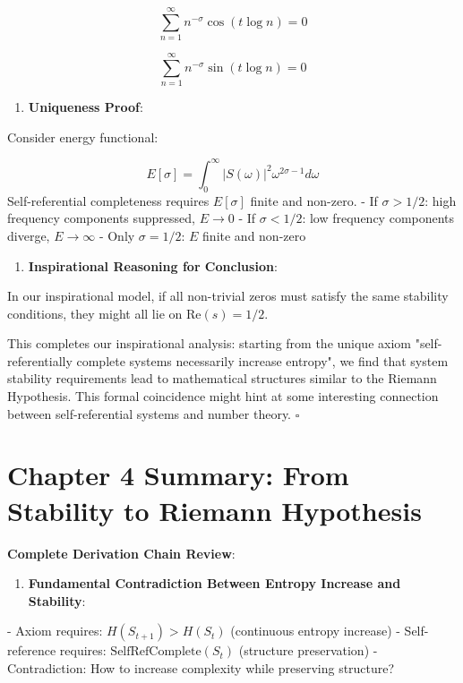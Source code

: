 \begin{equation}
\sum_{n=1}^{\infty} n^{-\sigma} \cos(t \log n) = 0
\end{equation}
   
\begin{equation}
\sum_{n=1}^{\infty} n^{-\sigma} \sin(t \log n) = 0
\end{equation}

\begin{enumerate}
\item \textbf{Uniqueness Proof}:
\end{enumerate}
   Consider energy functional:
   
\begin{equation}
E[\sigma] = \int_0^\infty |S(\omega)|^2 \omega^{2\sigma-1} d\omega
\end{equation}
   Self-referential completeness requires $E[\sigma]$ finite and non-zero.
   - If $\sigma > 1/2$: high frequency components suppressed, $E \to 0$
   - If $\sigma < 1/2$: low frequency components diverge, $E \to \infty$
   - Only $\sigma = 1/2$: $E$ finite and non-zero
   
\begin{enumerate}
\item \textbf{Inspirational Reasoning for Conclusion}:
\end{enumerate}
   In our inspirational model, if all non-trivial zeros must satisfy the same stability conditions,
   they might all lie on $\text{Re}(s) = 1/2$.

This completes our inspirational analysis: starting from the unique axiom "self-referentially complete systems necessarily increase entropy",
we find that system stability requirements lead to mathematical structures similar to the Riemann Hypothesis.
This formal coincidence might hint at some interesting connection between self-referential systems and number theory. $\square$

\section{Chapter 4 Summary: From Stability to Riemann Hypothesis}
\label{sec:ch04_riemann:chapter-4-summary-from-stability-to-riemann-hypothesis}

\textbf{Complete Derivation Chain Review}:

\begin{enumerate}
\item \textbf{Fundamental Contradiction Between Entropy Increase and Stability}:
\end{enumerate}
   - Axiom requires: $H(S_{t+1}) > H(S_t)$ (continuous entropy increase)
   - Self-reference requires: $\text{SelfRefComplete}(S_t)$ (structure preservation)
   - Contradiction: How to increase complexity while preserving structure?

